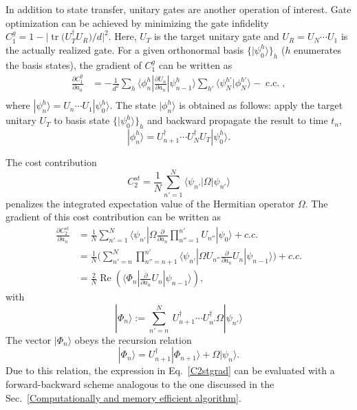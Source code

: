 \documentclass[12pt]{article}
\DeclareMathOperator{\cc}{c.c.}
\DeclareMathOperator{\Real}{Re}
\newcommand{\dket}[1]{|#1\rangle}
\newcommand{\dbra}[1]{\langle#1|}
\begin{document}
In addition to state transfer, unitary gates are another operation of interest. Gate optimization can be achieved by minimizing the gate infidelity $C_1^{g}=1-\big|\operatorname{tr}\big(U_T^{\dagger} U_R\big)/d\big|^2$. Here, $U_T$ is the target unitary gate and $U_R=U_N\cdots U_1$ is the actually realized gate. For a given  orthonormal basis $\{\dket{\psi^h_0}\}_h$ ($h$ enumerates the basis states), the gradient of $C_1^{ g}$ can be written as 
\begin{equation} 
\begin{aligned}
\label{gategradient}
  \frac{\partial C_1^{ g} }{\partial a_{ n}}
  &=-\frac{1}{d^2}\sum_{h}\langle\phi_n^h|\frac {\partial  U_n}{\partial a_{n}}|\psi^h_{n-1}\rangle \sum_{h'}\dbra{\psi_N^{h'}}\phi_N^{h'}\rangle
  -\cc,\\
\end{aligned}
\end{equation}
where $\dket{\psi_{n}^h}=U_n\cdots U_1\dket{\psi_0^h}$. The state $\dket{\phi_{n}^h}$ is obtained as follows: apply the target unitary $U_T$ to basis state $\{\dket{\psi^h_0}\}_h$ and backward propagate the result to time $t_n$,
\begin{equation}
\dket{\phi_{n}^h}=U_{n+1}^\dagger \cdots U_{N}^\dagger U_T\dket{\psi_0^h}.
\end{equation}


The cost contribution 
\begin{equation}
\label{c2st}
C_2^{st}=\frac{1}{N}\sum_{n'=1}^N \dbra{\psi_{n'}}\Omega \dket{\psi_{n'}}
\end{equation} 
penalizes the integrated expectation value of the Hermitian operator $\Omega$. The gradient of this cost contribution can be written as
\begin{align}
\nonumber \frac{\partial C_{2}^{st} }{\partial a_{n}}
&=\frac{1}{N}\sum_{n'=1}^N \dbra{\psi_{n'}}\Omega \frac{\partial }{\partial a_{n}}\prod_{n''=1}^{n'}U_{n''}\dket{\psi_{0}}+c.c.\\
\nonumber &=\frac{1}{N}\bigg(\sum_{n'=n}^N \prod_{n''=n+1}^{n'} \dbra{\psi_{n'}}\Omega U_{n''} \frac{\partial }{\partial a_{n}}U_n\dket{\psi_{n-1}}\bigg)+c.c.\\
\label{C2stgrad} &=\frac{2}{N}\Real (\dbra{\Phi_{n}}\frac{\partial }{\partial a_{n}}U_n \dket{\psi_{n-1}}),
\end{align}
with
\begin{equation}
    \dket{\Phi_n}:=\sum_{n'= n}^N~ U_{n+1}^\dagger \cdots U_{n'}^\dagger \Omega\dket{\psi_{n'}}
\end{equation}
The vector $\dket{\Phi_n}$ obeys the recursion relation
\begin{equation}
    \dket{\Phi_n}=U_{n+1}^\dagger \dket{\Phi_{n+1}}+\Omega \dket{\psi_n}.
\end{equation}
Due to this relation, the expression in Eq.\ \eqref{C2stgrad} can be evaluated with a forward-backward scheme analogous to the one discussed in the Sec.\ \ref{Computationally and memory efficient algorithm}.
\end{document}
